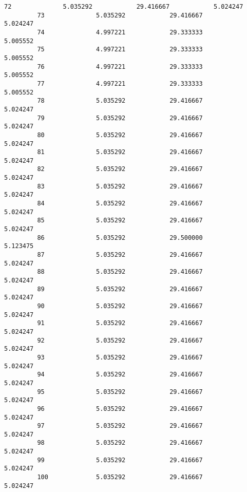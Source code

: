 \documentclass[11pt]{article}
\begin{document}
\begin{Verbatim}[commandchars=\\\{\}]
         72              5.035292            29.416667            5.024247   
         73              5.035292            29.416667            5.024247   
         74              4.997221            29.333333            5.005552   
         75              4.997221            29.333333            5.005552   
         76              4.997221            29.333333            5.005552   
         77              4.997221            29.333333            5.005552   
         78              5.035292            29.416667            5.024247   
         79              5.035292            29.416667            5.024247   
         80              5.035292            29.416667            5.024247   
         81              5.035292            29.416667            5.024247   
         82              5.035292            29.416667            5.024247   
         83              5.035292            29.416667            5.024247   
         84              5.035292            29.416667            5.024247   
         85              5.035292            29.416667            5.024247   
         86              5.035292            29.500000            5.123475   
         87              5.035292            29.416667            5.024247   
         88              5.035292            29.416667            5.024247   
         89              5.035292            29.416667            5.024247   
         90              5.035292            29.416667            5.024247   
         91              5.035292            29.416667            5.024247   
         92              5.035292            29.416667            5.024247   
         93              5.035292            29.416667            5.024247   
         94              5.035292            29.416667            5.024247   
         95              5.035292            29.416667            5.024247   
         96              5.035292            29.416667            5.024247   
         97              5.035292            29.416667            5.024247   
         98              5.035292            29.416667            5.024247   
         99              5.035292            29.416667            5.024247   
         100             5.035292            29.416667            5.024247   
         

\end{Verbatim}
\end{document}
